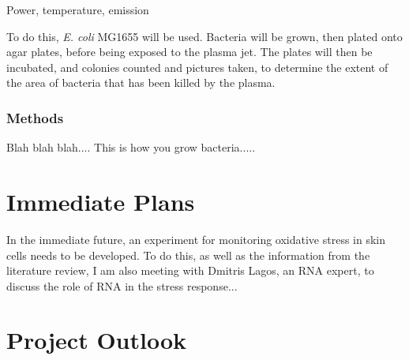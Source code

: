 \documentclass[11pt, oneside]{article}   	%
\begin{document}
Power, temperature, emission

To do this, \textit{E. coli} MG1655 will be used. 
Bacteria will be grown, then plated onto agar plates, before being exposed to the plasma jet. 
The plates will then be incubated, and colonies counted and pictures taken, to determine the extent of the area of bacteria that has been killed by the plasma.

\subsubsection{Methods}
Blah blah blah.... This is how you grow bacteria.....

\section{Immediate Plans}
In the immediate future, an experiment for monitoring oxidative stress in skin cells needs to be developed. 
To do this, as well as the information from the literature review, I am also meeting with Dmitris Lagos, an RNA expert, to discuss the role of RNA in the stress response...


\section{Project Outlook}
\end{document}
